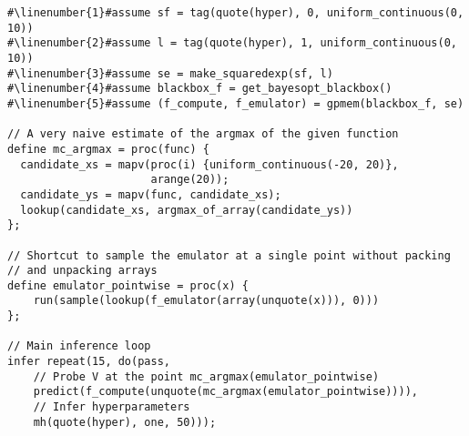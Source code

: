 \begin{mdframed}
\begin{minipage}{\linewidth}
\small
\belowcaptionskip=-10pt
\begin{lstlisting}[caption={Bayesian optimization using \gpmem},mathescape,numbers=none,label=alg:bayesopt,escapechar=\#]
#\linenumber{1}#assume sf = tag(quote(hyper), 0, uniform_continuous(0, 10))
#\linenumber{2}#assume l = tag(quote(hyper), 1, uniform_continuous(0, 10))
#\linenumber{3}#assume se = make_squaredexp(sf, l)
#\linenumber{4}#assume blackbox_f = get_bayesopt_blackbox()
#\linenumber{5}#assume (f_compute, f_emulator) = gpmem(blackbox_f, se)

// A very naive estimate of the argmax of the given function
define mc_argmax = proc(func) {
  candidate_xs = mapv(proc(i) {uniform_continuous(-20, 20)},
                      arange(20));
  candidate_ys = mapv(func, candidate_xs);
  lookup(candidate_xs, argmax_of_array(candidate_ys))
};

// Shortcut to sample the emulator at a single point without packing
// and unpacking arrays
define emulator_pointwise = proc(x) {
    run(sample(lookup(f_emulator(array(unquote(x))), 0)))
};

// Main inference loop
infer repeat(15, do(pass,
    // Probe V at the point mc_argmax(emulator_pointwise)
    predict(f_compute(unquote(mc_argmax(emulator_pointwise)))),
    // Infer hyperparameters
    mh(quote(hyper), one, 50)));
\end{lstlisting}
  
\end{minipage}
\end{mdframed}     